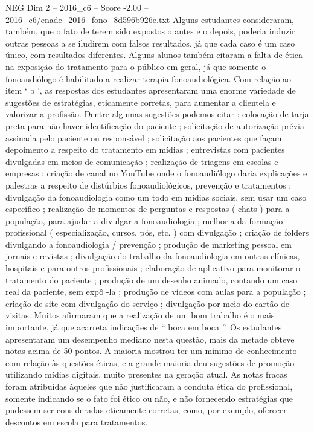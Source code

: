 \begin{textsample}{NEG Dim 2 – 2016\_c6 – Score -2.00 – 2016\_c6/enade\_2016\_fono\_8d596b926e.txt}
Alguns estudantes consideraram, também, que o fato de terem sido expostos o antes e o depois, poderia induzir outras pessoas a se iludirem com falsos resultados, já que cada caso é um caso único, com resultados diferentes.
Alguns alunos também citaram a falta de ética na exposição do tratamento para o público em geral, já que somente o fonoaudiólogo é habilitado a realizar terapia fonoaudiológica.
Com relação ao item ‘ b ’, as respostas dos estudantes apresentaram uma enorme variedade de sugestões de estratégias, eticamente corretas, para aumentar a clientela e valorizar a profissão.
Dentre algumas sugestões podemos citar : colocação de tarja preta para não haver identificação do paciente ; solicitação de autorização prévia assinada pelo paciente ou responsável ; solicitação aos pacientes que façam depoimento a respeito do tratamento em mídias ; entrevistas com pacientes divulgadas em meios de comunicação ; realização de triagens em escolas e empresas ; criação de canal no YouTube onde o fonoaudiólogo daria explicações e palestras a respeito de distúrbios fonoaudiológicos, prevenção e tratamentos ; divulgação da fonoaudiologia como um todo em mídias sociais, sem usar um caso específico ; realização de momentos de perguntas e respostas ( chats ) para a população, para ajudar a divulgar a fonoaudiologia ; melhoria da formação profissional ( especialização, cursos, pós, etc. ) com divulgação ; criação de folders divulgando a fonoaudiologia / prevenção ; produção de marketing pessoal em jornais e revistas ; divulgação do trabalho da fonoaudiologia em outras clínicas, hospitais e para outros profissionais ; elaboração de aplicativo para monitorar o tratamento do paciente ; produção de um desenho animado, contando um caso real da paciente, sem expô -la ; produção de vídeos com aulas para a população ; criação de site com divulgação do serviço ; divulgação por meio do cartão de visitas.
Muitos afirmaram que a realização de um bom trabalho é o mais importante, já que acarreta indicações de “ boca em boca ”.
Os estudantes apresentaram um desempenho mediano nesta questão, mais da metade obteve notas acima de 50 pontos.
A maioria mostrou ter um mínimo de conhecimento com relação às questões éticas, e a grande maioria deu sugestões de promoção utilizando mídias digitais, muito presentes na geração atual.
As notas fracas foram atribuídas àqueles que não justificaram a conduta ética do profissional, somente indicando se o fato foi ético ou não, e não fornecendo estratégias que pudessem ser consideradas eticamente corretas, como, por exemplo, oferecer descontos em escola para tratamentos.

\end{textsample}
